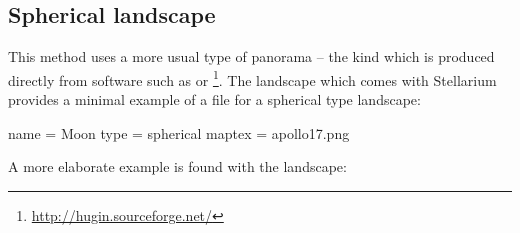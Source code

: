 \subsection{Spherical landscape}
\label{sec:landscapes:Spherical}

This method uses a more usual type of panorama -- the kind which is
produced directly from software such as  or
\footnote{\url{http://hugin.sourceforge.net/}}.  The
 landscape which comes with Stellarium provides a
minimal example of a  file for a spherical type
landscape:

\begin{configfile}
[landscape]
name = Moon
type = spherical
maptex = apollo17.png
\end{configfile}
A more elaborate example is found with the  landscape:

